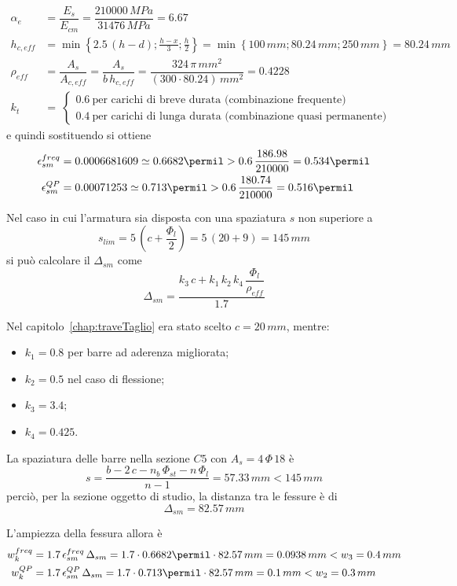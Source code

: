 \begin{align*}
	\alpha_e &= \dfrac{E_s}{E_{cm}} = \dfrac{210000\,MPa}{31476\,MPa} = 6.67\\
	h_{c,eff} &= \min\left\{2.5\,(h-d); \frac{h-x}{3}; \frac{h}{2}\right\} = \min\left\{100\,mm; 80.24\,mm; 250\,mm\right\} = 80.24\,mm\\ 
	\rho_{eff} &= \dfrac{A_s}{A_{c,eff}} = \dfrac{A_s}{b\,h_{c,eff}} = \dfrac{324\,\pi\,mm^2}{(300\cdot 80.24)\,mm^2} = 0.4228\\
	k_t &= \
	\begin{cases}
		0.6~\text{per carichi di breve durata (combinazione frequente)}\\
		0.4~\text{per carichi di lunga durata (combinazione quasi permanente)}
	\end{cases}
\end{align*}
e quindi sostituendo si ottiene
\begin{align}
	\epsilon_{sm}^{freq} &= 0.0006681609 \simeq 0.6682\permil > 0.6\,\dfrac{186.98}{210000} = 0.534\permil\\
	\epsilon_{sm}^{QP} &= 0.00071253 \simeq 0.713\permil > 0.6\,\dfrac{180.74}{210000} = 0.516\permil
\end{align}

Nel caso in cui l'armatura sia disposta con una spaziatura $s$ non superiore a
\[
s_{lim} = 5\,(c + \dfrac{\Phi_l}{2}) = 5\,(20+ 9 )= 145\,mm
\]
si può calcolare il $\Delta_{sm}$ come
\begin{equation}
    \label{eq:Deltasm}
	\Delta_{sm} = \dfrac{k_3\,c + k_1\,k_2\,k_4\,\dfrac{\Phi_l}{\rho_{eff}}}{1.7}
\end{equation}

Nel capitolo~\ref{chap:traveTaglio} era stato scelto $c = 20\,mm$, mentre:
\begin{itemize}
    \item $k_1 = 0.8$ per barre ad aderenza migliorata;
	\item $k_2 = 0.5$ nel caso di flessione;
	\item $k_3 = 3.4$;
	\item $k_4 = 0.425$.
\end{itemize}

La spaziatura delle barre nella sezione $C5$ con $A_s = 4\,\Phi\,18$ è
\[
s = \dfrac{b - 2\,c - n_b\,\Phi_{st} - n\,\Phi_l}{n-1} = 57.33\,mm < 145\,mm
\]
perciò, per la sezione oggetto di studio, la distanza tra le fessure è di
\[
\Delta_{sm} = 82.57\,mm
\]

L'ampiezza della fessura allora è
\begin{align}
	w_k^{freq} &= 1.7\,\epsilon_{sm}^{freq}\,\Delta_{sm} = 1.7\cdot   0.6682\permil\cdot 82.57\,mm = 0.0938\,mm < w_3 = 0.4\,mm\\
	w_k^{QP} &= 1.7\,\epsilon_{sm}^{QP}\,\Delta_{sm} = 1.7\cdot   0.713\permil\cdot 82.57\,mm = 0.1\,mm < w_2 = 0.3\,mm
\end{align}

